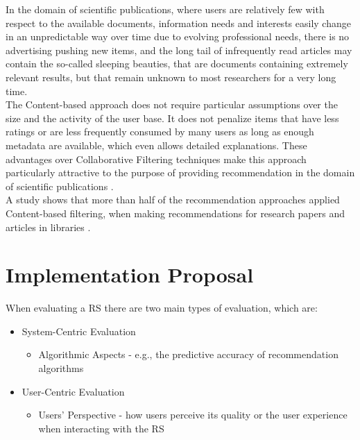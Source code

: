 \documentclass[\myFontSize,oneside,english,hidelinks,a4paper]{article}
\begin{document}
%
%
%
In the domain of scientific publications, where users are relatively few with respect to the available documents, information needs and interests easily change in an unpredictable way over time due to evolving professional needs, there is no advertising pushing new items, and the long tail of infrequently read articles may contain the so-called sleeping beauties, that are documents containing extremely relevant results, but that remain unknown to most researchers for a very long time. \\
The Content-based approach does not require particular assumptions over the size and the activity of the user base. It does not penalize items that have less ratings or are less frequently consumed by many users as long as enough metadata are available, which even allows detailed explanations. These advantages over Collaborative Filtering techniques make this approach particularly attractive to the purpose of providing recommendation in the domain of scientific publications \cite{De_Nart201484}. \\
%
A study shows that more than half of the recommendation approaches applied Content-based filtering, when making recommendations for research papers and articles in libraries \cite{Beel2016305}. \\
%







\clearpage
\section{Implementation Proposal}
When evaluating a RS there are two main types of evaluation, which are:
\begin{itemize}
\item System-Centric Evaluation
	\begin{itemize}
	\item Algorithmic Aspects - e.g., the predictive accuracy of recommendation algorithms
	\end{itemize}

\item User-Centric Evaluation
	\begin{itemize}
	\item Users' Perspective - how users perceive its quality or the user experience when interacting with the RS
	\end{itemize}

\end{itemize}
\end{document}
